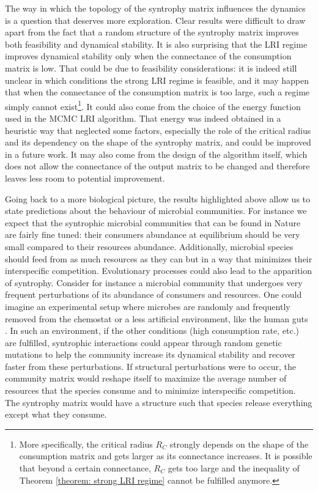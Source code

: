 \documentclass[12pt, titlepage]{report}
\begin{document}
The way in which the topology of the syntrophy matrix influences the dynamics is a question that deserves more exploration. Clear results were difficult to draw apart from the fact that a random structure of the syntrophy matrix improves both feasibility and dynamical stability. It is also surprising that the LRI regime improves dynamical stability only when the connectance of the consumption matrix is low. That could be due to feasibility considerations: it is indeed still unclear in which conditions the strong LRI regime is feasible, and it may happen that when the connectance of the consumption matrix is too large, such a regime simply cannot exist\footnote{More specifically, the critical radius $R_C$ strongly depends on the shape of the consumption matrix and gets larger as its connectance increases. It is possible that beyond a certain connectance, $R_C$ gets too large and the inequality of Theorem \ref{theorem: strong LRI regime} cannot be fulfilled anymore.}. It could also come from the choice of the energy function used in the MCMC LRI algorithm. That energy was indeed obtained in a heuristic way that neglected some factors, especially the role of the critical radius and its dependency on the shape of the syntrophy matrix, and could be improved in a future work. It may also come from the design of the algorithm itself, which does not allow the connectance of the output matrix to be changed and therefore leaves less room to potential improvement.


Going back to a more biological picture, the results highlighted above allow us to state predictions about the behaviour of microbial communities. For instance we expect that the syntrophic microbial communities that can be found in Nature are fairly fine tuned: their consumers abundance at equilibrium should be very small compared to their resources abundance. Additionally, microbial species should feed from as much resources as they can but in a way that minimizes their interspecific competition. Evolutionary processes could also lead to the apparition of syntrophy. Consider for instance a microbial community that undergoes very frequent perturbations of its abundance of consumers and resources. One could imagine an experimental setup where microbes are randomly and frequently removed from the chemostat or a less artificial environment, like the human guts \cite{stein_ecological_2013}. In such an environment, if the other conditions (high consumption rate, etc.) are fulfilled, syntrophic interactions could appear through random genetic mutations to help the community increase its dynamical stability and recover faster from these perturbations. If structural perturbations were to occur, the community matrix would reshape itself to maximize the average number of resources that the species consume and to minimize interspecific competition. The syntrophy matrix would have a structure such that species release everything except what they consume.
\end{document}
